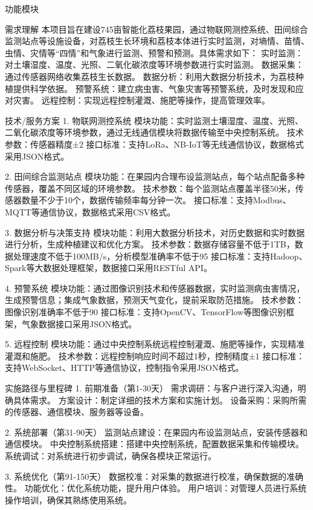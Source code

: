 \documentclass[12pt,a4paper]{article}
\begin{document}
\begin{itemize}
\begin{itemize}
\begin{itemize}
\begin{itemize}
\begin{itemize}
\begin{itemize}
\begin{itemize}
\begin{itemize}
\begin{itemize}
\begin{itemize}
\begin{itemize}
功能模块

需求理解
本项目旨在建设745亩智能化荔枝果园，通过物联网测控系统、田间综合监测站点等设施设备，对荔枝生长环境和荔枝本体进行实时监测，对墒情、苗情、虫情、灾情等“四情”和气象进行监测、预警和预测。具体需求如下：
实时监测：对土壤湿度、温度、光照、二氧化碳浓度等环境参数进行实时监测。
数据采集：通过传感器网络收集荔枝生长数据。
数据分析：利用大数据分析技术，为荔枝种植提供科学依据。
预警系统：建立病虫害、气象灾害等预警系统，及时发现和应对灾害。
远程控制：实现远程控制灌溉、施肥等操作，提高管理效率。

技术/服务方案
1. 物联网测控系统
模块功能：实时监测土壤湿度、温度、光照、二氧化碳浓度等环境参数，通过无线通信模块将数据传输至中央控制系统。
技术参数：传感器精度±2%
接口标准：支持LoRa、NB-IoT等无线通信协议，数据格式采用JSON格式。

2. 田间综合监测站点
模块功能：在果园内合理布设监测站点，每个站点配备多种传感器，覆盖不同区域的环境参数。
技术参数：每个监测站点覆盖半径50米，传感器数量不少于10个，数据传输频率每分钟一次。
接口标准：支持Modbus、MQTT等通信协议，数据格式采用CSV格式。

3. 数据分析与决策支持
模块功能：利用大数据分析技术，对历史数据和实时数据进行分析，生成种植建议和优化方案。
技术参数：数据存储容量不低于1TB，数据处理速度不低于100MB/s，分析模型准确率不低于95%
接口标准：支持Hadoop、Spark等大数据处理框架，数据接口采用RESTful API。

4. 预警系统
模块功能：通过图像识别技术和传感器数据，实时监测病虫害情况，生成预警信息；集成气象数据，预测天气变化，提前采取防范措施。
技术参数：图像识别准确率不低于90%
接口标准：支持OpenCV、TensorFlow等图像识别框架，气象数据接口采用JSON格式。

5. 远程控制
模块功能：通过中央控制系统远程控制灌溉、施肥等操作，实现精准灌溉和施肥。
技术参数：远程控制响应时间不超过1秒，控制精度±1%
接口标准：支持WebSocket、HTTP等通信协议，控制指令采用JSON格式。

实施路径与里程碑
1. 前期准备（第1-30天）
需求调研：与客户进行深入沟通，明确具体需求。
方案设计：制定详细的技术方案和实施计划。
设备采购：采购所需的传感器、通信模块、服务器等设备。

2. 系统部署（第31-90天）
监测站点建设：在果园内布设监测站点，安装传感器和通信模块。
中央控制系统搭建：搭建中央控制系统，配置数据采集和传输模块。
系统调试：对系统进行初步调试，确保各模块正常运行。

3. 系统优化（第91-150天）
数据校准：对采集的数据进行校准，确保数据的准确性。
功能优化：优化系统功能，提升用户体验。
用户培训：对管理人员进行系统操作培训，确保其熟练使用系统。


\end{itemize}
\end{itemize}
\end{itemize}
\end{itemize}
\end{itemize}
\end{itemize}
\end{itemize}
\end{itemize}
\end{itemize}
\end{itemize}
\end{itemize}
\end{document}
